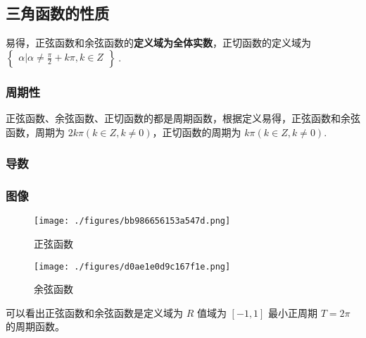 
\begin{issues}
\issueDraft
\end{issues}


\subsection{三角函数的性质}
易得，正弦函数和余弦函数的\textbf{定义域为全体实数}，正切函数的定义域为 $\begin{Bmatrix}\alpha|\alpha \neq \frac{\pi}{2}+k\pi,k\in Z\end{Bmatrix}~.$
\subsubsection{周期性}
正弦函数、余弦函数、正切函数的都是周期函数，根据定义易得，正弦函数和余弦函数，周期为 $2k\pi(k\in Z,k\neq0)$，正切函数的周期为 $k\pi(k\in Z,k\neq0)$.
\subsubsection{导数}

\subsubsection{图像}

\begin{figure}[ht]
\centering
\texttt{[image: ./figures/bb986656153a547d.png]}
\caption{正弦函数} \label{fig_HsTFFv_1}
\end{figure}
\begin{figure}[ht]
\centering
\texttt{[image: ./figures/d0ae1e0d9c167f1e.png]}
\caption{余弦函数} \label{fig_HsTFFv_2}
\end{figure}
可以看出正弦函数和余弦函数是定义域为 $R$ 值域为 $[-1,1]$ 最小正周期 $T = 2\pi$ 的周期函数。
